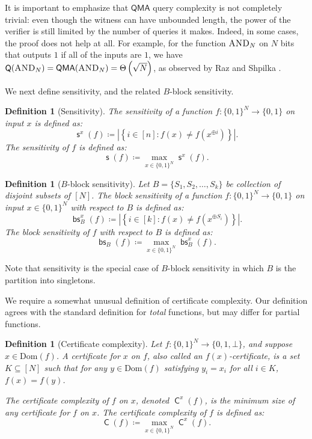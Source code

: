 \documentclass[11pt]{article}%
\newtheorem{definition}[theorem]{Definition}
\newcommand{\AND}{\normalfont\textsc{AND}} %
\newcommand{\Dom}{\mathrm{Dom}}
\DeclareMathOperator{\C}{\mathsf{C}}
\DeclareMathOperator{\Q}{\mathsf{Q}}
\DeclareMathOperator{\s}{\mathsf{s}}
\DeclareMathOperator{\bs}{\mathsf{bs}}
\DeclareMathOperator{\QMA}{\mathsf{QMA}}
\begin{document}
It is important to emphasize that $\mathsf{QMA}$ query complexity is not completely trivial: even though the witness can have unbounded length, the power of the verifier is still limited by the number of queries it makes. Indeed, in some cases, the proof does not help at all. For example, for the function $\AND_N$ on $N$ bits that outputs $1$ if all of the inputs are $1$, we have $\Q(\AND_N) = \QMA(\AND_N) = \Theta\left(\sqrt{N}\right)$, as observed by Raz and Shpilka \cite{RS04}.

We next define sensitivity, and the related $B$-block sensitivity.

\begin{definition}[Sensitivity]
The \emph{sensitivity} of a function $f: \{0,1\}^N \to \{0,1\}$ on input $x$ is defined as:
\[
\s^x(f) \coloneqq \left|\left\{i \in [n] : f(x) \neq f\left(x^{\oplus i}\right)\right\}\right|.
\]
The \emph{sensitivity of $f$} is defined as:
\[
\s(f) \coloneqq \max_{x \in \{0,1\}^N} \s^x(f).
\]
\end{definition}

\begin{definition}[$B$-block sensitivity]
\label{def:d_block_sensitivity}
Let $B = \{S_1,S_2,\ldots,S_k\}$ be collection of disjoint subsets of $[N]$. The \emph{block sensitivity} of a function $f: \{0,1\}^N \to \{0,1\}$ on input $x \in \{0,1\}^N$ with respect to $B$ is defined as:
\[
\bs_B^x(f) \coloneqq \left|\left\{i \in [k] : f(x) \neq f\left(x^{\oplus S_i}\right)\right\}\right|.
\]
The \emph{block sensitivity of $f$} with respect to $B$ is defined as:
\[
\bs_B(f) \coloneqq \max_{x \in \{0,1\}^N} \bs_B^x(f).
\]
\end{definition}

Note that sensitivity is the special case of $B$-block sensitivity in which $B$ is the partition into singletons.

We require a somewhat unusual definition of certificate complexity. Our definition agrees with the standard definition for \textit{total} functions, but may differ for partial functions.

\begin{definition}[Certificate complexity]
\label{def:certificate_complexity}
Let $f: \{0,1\}^N \to \{0,1,\bot\}$, and suppose $x \in \Dom(f)$. A \emph{certificate for $x$ on $f$}, also called an \emph{$f(x)$-certificate}, is a set $K \subseteq [N]$ such that for any $y \in \Dom(f)$ satisfying $y_i = x_i$ for all $i \in K$, $f(x) = f(y)$.

The \emph{certificate complexity of $f$ on $x$}, denoted $\C^x(f)$, is the minimum size of any certificate for $f$ on $x$. The \emph{certificate complexity of $f$} is defined as:
\[
\C(f) \coloneqq \max_{x \in \{0,1\}^N} \C^x(f).
\]
\end{definition}
\end{document}
